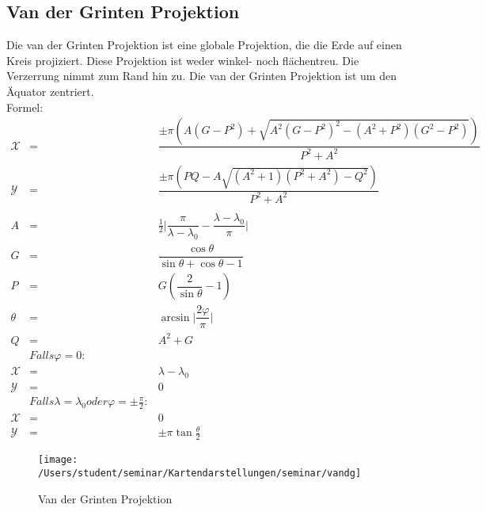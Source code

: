 \subsection{Van der Grinten Projektion}
\label{sec:vander}
Die van der Grinten Projektion ist eine globale Projektion, die die Erde auf einen Kreis projiziert. Diese Projektion ist weder winkel- noch flächentreu. Die Verzerrung nimmt zum Rand hin zu. Die van der Grinten Projektion ist um den Äquator zentriert.\\
Formel:\\
\begin{eqnarray*}
\mathcal{X}&=&\dfrac{\pm \pi(A(G-P^2)+\sqrt{A^2(G-P^2)^2 -(A^2 +P^2)(G^2 -P^2)})}{P^2 +A^2}\\
\mathcal{Y}&=&\dfrac{\pm \pi (PQ-A\sqrt{(A^2 +1)(P^2 +A^2)-Q^2})}{P^2 +A^2}\\
\\
A&=&\frac{1}{2}\vert \dfrac{\pi}{\lambda -\lambda _0}-\dfrac{\lambda -\lambda _0}{\pi}\vert\\
G&=&\dfrac{\cos \theta}{\sin \theta +\cos \theta -1}\\
P&=&G(\dfrac{2}{\sin\theta}-1)\\
\theta &=&\arcsin \vert\dfrac{2\varphi}{\pi}\vert\\
Q&=&A^2 +G\\
 &Falls \varphi =0:\\
 \mathcal{X}&=&\lambda -\lambda _0\\
 \mathcal{Y}&=&0\\
 &Falls \lambda =\lambda _0 oder \varphi =\pm\frac{\pi}{2}:\\
 \mathcal{X}&=&0\\
 \mathcal{Y}&=&\pm \pi \tan \frac{\theta}{2}
\end{eqnarray*}

\begin{figure}[hbtp]
\centering
\texttt{[image: /Users/student/seminar/Kartendarstellungen/seminar/vandg]} \caption{Van der Grinten Projektion}
\end{figure}
\newpage 